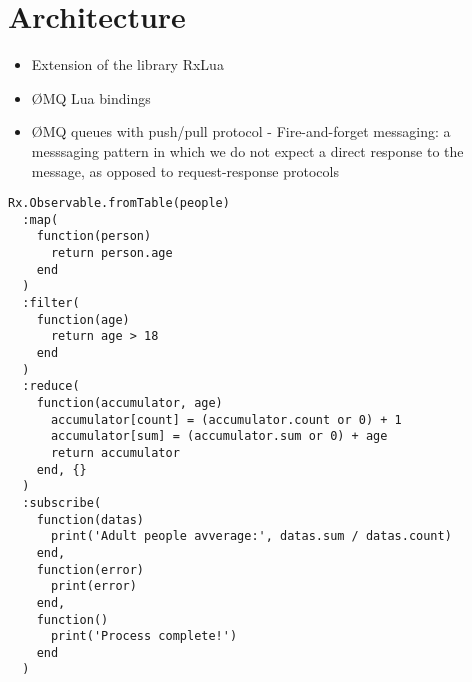 \section{Architecture}
\label{sec:architecture}

\begin{itemize}
  \item Extension of the library RxLua
  \item ØMQ Lua bindings
  \item ØMQ queues with push/pull protocol - Fire-and-forget messaging: a messsaging pattern in which we do not expect a direct response to the message, as opposed to request-response protocols
\end{itemize}



\begin{lstlisting}[frame=single]
Rx.Observable.fromTable(people)
  :map(
    function(person)
      return person.age
    end
  )
  :filter(
    function(age)
      return age > 18
    end
  )
  :reduce(
    function(accumulator, age)
      accumulator[count] = (accumulator.count or 0) + 1
      accumulator[sum] = (accumulator.sum or 0) + age
      return accumulator
    end, {}
  )
  :subscribe(
    function(datas)
      print('Adult people avverage:', datas.sum / datas.count)
    end,
    function(error)
      print(error)
    end,
    function()
      print('Process complete!')
    end
  )
\end{lstlisting}
